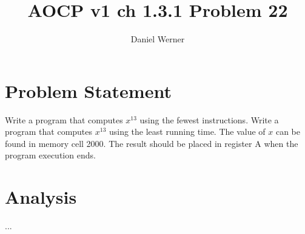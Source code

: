 \documentclass{article}
\title{AOCP v1 ch 1.3.1 Problem 22}
\author{Daniel Werner}
\begin{document}
\maketitle

\section*{
    Problem Statement
}

Write a program that computes $x^13$ using the fewest instructions.  Write a
program that computes $x^13$ using the least running time.  The value of $x$
can be found in memory cell 2000.  The result should be placed in register A
when the program execution ends.

\section*{
    Analysis
}

...
\end{document}
